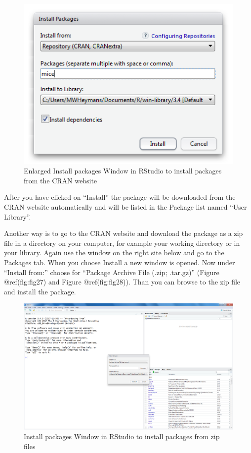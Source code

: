 \documentclass[
]{book}
\begin{document}
\begin{figure}

{\centering \includegraphics[width=0.95\linewidth]{images/fig1.25b} 

}

\caption{Enlarged Install packages Window in RStudio to install packages from the CRAN website}\label{fig:fig26}
\end{figure}

After you have clicked on ``Install'' the package will be downloaded
from the CRAN website automatically and will be listed in the Package
list named ``User Library''.

Another way is to go to the CRAN website and download the package as a
zip file in a directory on your computer, for example your working
directory or in your library. Again use the window on the right site
below and go to the Packages tab. When you choose Install a new window
is opened. Now under ``Install from:'' choose for ``Package Archive File
(.zip; .tar.gz)'' (Figure @ref(fig:fig27) and Figure @ref(fig:fig28)).
Than you can browse to the zip file and install the package.

\begin{figure}

{\centering \includegraphics[width=0.95\linewidth]{images/fig1.26a} 

}

\caption{Install packages Window in RStudio to install packages from zip files}\label{fig:fig27}
\end{figure}
\end{document}
